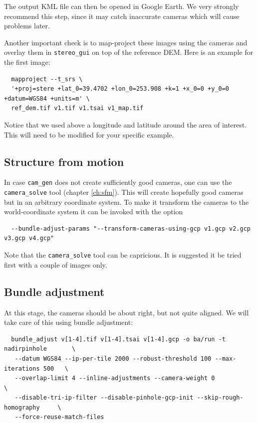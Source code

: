 The output KML file can then be opened in Google Earth. We very strongly recommend this step, 
since it may catch inaccurate cameras which will cause problems later. 

Another important check is to map-project these images using the cameras
and overlay them in \texttt{stereo\_gui} on top of the reference
DEM. Here is an example for the first image:
\begin{verbatim}
  mapproject --t_srs \
  '+proj=stere +lat_0=39.4702 +lon_0=253.908 +k=1 +x_0=0 +y_0=0 +datum=WGS84 +units=m' \
  ref_dem.tif v1.tif v1.tsai v1_map.tif 
\end{verbatim}

Notice that we used above a longitude and latitude around the area of interest. This 
will need to be modified for your specific example. 

\subsection{Structure from motion}

In case \texttt{cam\_gen} does not create sufficiently good cameras, 
one can use the \texttt{camera\_solve} tool (chapter \ref{ch:sfm}).
This will create hopefully good cameras but in an arbitrary coordinate system.
To make it transform the cameras to the world-coordinate system it can be invoked
with the option

\begin{verbatim}
  --bundle-adjust-params "--transform-cameras-using-gcp v1.gcp v2.gcp v3.gcp v4.gcp"
\end{verbatim}

Note that the \texttt{camera\_solve} tool can be capricious. It is suggested
it be tried first with a couple of images only.

\subsection{Bundle adjustment}

At this stage, the cameras should be about right, but not quite
aligned. We will take care of this using bundle adjustment:

\begin{verbatim}
  bundle_adjust v[1-4].tif v[1-4].tsai v[1-4].gcp -o ba/run -t nadirpinhole       \
   --datum WGS84 --ip-per-tile 2000 --robust-threshold 100 --max-iterations 500   \
   --overlap-limit 4 --inline-adjustments --camera-weight 0                       \
   --disable-tri-ip-filter --disable-pinhole-gcp-init --skip-rough-homography     \
   --force-reuse-match-files
\end{verbatim}

